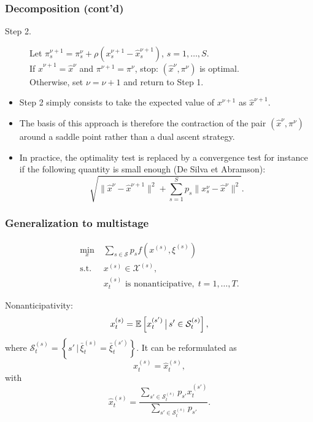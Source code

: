 \documentclass{beamer}
\def\cS{\mathcal{S}}
\def\cX{\mathcal{X}}
\begin{document}
\begin{frame}
\frametitle{Decomposition (cont'd)}

\begin{description}
\item[Step 2.]
Let $\pi^{\nu+1}_s = \pi^{\nu}_s + \rho \left(x_s^{\nu+1}-\hat{x}_s
^{\nu+1}\right)$, $s = 1,\ldots{}, S$.\\
If $\hat{x}^{\nu+1} = \hat{x}^{\nu}$ and $\pi^{\nu+1} = \pi^{\nu}$,
stop: $(\hat{x}^{\nu}, \pi^{\nu})$ is optimal.\\
Otherwise, set $\nu = \nu+1$ and return to Step 1.
\end{description}

\mbox{}

\begin{itemize}
\item
Step 2 simply consists to take the expected value of $x^{\nu+1}$
as $\hat{x}^{\nu+1}$.
\item
The basis of this approach is therefore the contraction of the pair $(\hat{x}^{\nu}, \pi^{\nu})$ around a saddle point rather than a dual ascent strategy.
\item
In practice, the optimality test is replaced by a convergence test for instance if the following quantity is small enough (De Silva et Abramson):
\[
\sqrt{ \| \hat{x}^{\nu} - \hat{x}^{\nu+1} \|^2 + \sum_{s = 1}^S p_s \|
  x_s^{\nu} - \hat{x}^{\nu}\|^2}.
\]
\end{itemize}

\end{frame}

\begin{frame}
\frametitle{Generalization to multistage}

$$
\begin{aligned}
\min_{x}\; & \sum_{s \in \cS} p_s f\left(x^{(s)}, \xi^{(s)}\right)\\
\text{s.t. } & x^{(s)} \in \cX^{(s)},\\
& x_t^{(s)} \mbox{ is nonanticipative},\; t = 1, \dots, T.
\end{aligned}
$$

Nonanticipativity:
$$
x_t^{(s)} = \EE\left[ x_t^{(s')} \,\big|\, s' \in \cS_t^{(s)} \right],
$$
where $\cS_t^{(s)} = \left\{ s' \,\big|\, \bar{\xi}_t^{(s)} = \bar{\xi}_t^{(s') }\right\}$.
It can be reformulated as
\[
x_t^{(s)} = \hat{x}_t^{(s)},
\]
with
$$
\hat{x}_t^{(s)} = \frac{\sum_{s' \in \cS_{t}^{(s)}} p_{s'} x_t^{(s')}}{\sum_{s' \in \cS_t^{(s)}} p_{s'}}.
$$

\end{frame}
\end{document}

